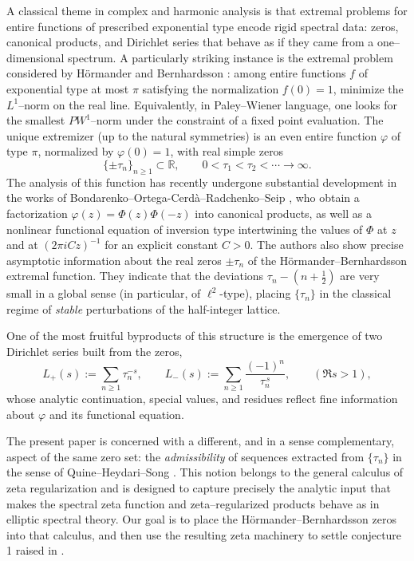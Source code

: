 \documentclass[11pt,letterpaper]{amsart}
\numberwithin{equation}{section}
\theoremstyle{definition}
\newcommand{\R}{\mathbb{R}}
\begin{document}
A classical theme in complex and harmonic analysis is that extremal problems for
entire functions of prescribed exponential type encode rigid spectral data: zeros,
canonical products, and Dirichlet series that behave as if they came from a
one--dimensional spectrum.  A particularly striking instance is the extremal
problem considered by H\"ormander and Bernhardsson \cite{HB93}: among entire functions
$f$ of exponential type at most $\pi$ satisfying the normalization $f(0)=1$, minimize
the $L^1$--norm on the real line.  Equivalently, in Paley--Wiener language, one looks
for the smallest $PW^1$--norm under the constraint of a fixed point evaluation.
The unique extremizer (up to the natural symmetries) is an even entire function
$\varphi$ of type $\pi$, normalized by $\varphi(0)=1$, with real simple zeros
\[
\{\pm\tau_n\}_{n\ge1}\subset\R,\qquad 0<\tau_1<\tau_2<\cdots\to\infty.
\]
The analysis of this function has recently undergone substantial development in the
works of Bondarenko--Ortega-Cerd\`a--Radchenko--Seip \cite{BOCRS,BOCRS2024_HBI}, who obtain a
factorization $\varphi(z)=\Phi(z)\Phi(-z)$ into canonical products, as well as a
nonlinear functional equation of inversion type intertwining the values of $\Phi$
at $z$ and at $(2\pi i C z)^{-1}$ for an explicit constant $C>0$. The authors also show precise asymptotic information about
the real zeros $\pm\tau_n$ of the H\"ormander--Bernhardsson extremal function.
They indicate that the deviations $\tau_n-(n+\tfrac12)$ are very small in a global sense (in particular, of $\ell^{2}$-type), placing $\{\tau_n\}$ in the classical regime of \emph{stable} perturbations of the half-integer lattice. 

One of the most fruitful byproducts of this structure is the emergence of two Dirichlet
series built from the zeros,
\[
L_+(s):=\sum_{n\ge1}\tau_n^{-s},
\qquad
L_-(s):=\sum_{n\ge1}\frac{(-1)^n}{\tau_n^{\,s}},
\qquad (\Re s>1),
\]
whose analytic continuation, special values, and residues reflect fine information
about $\varphi$ and its functional equation.

The present paper is concerned with a different, and in a sense complementary, aspect
of the same zero set: the \emph{admissibility} of sequences extracted from
$\{\tau_n\}$ in the sense of Quine--Heydari--Song \cite{QHS}.
This notion belongs to the general calculus of zeta regularization and is designed
to capture precisely the analytic input that makes the spectral zeta function and
zeta--regularized products behave as in elliptic spectral theory.
Our goal is to place the H\"ormander--Bernhardsson zeros into that calculus, and then
use the resulting zeta machinery to settle conjecture 1 raised in \cite{BOCRS}.
\end{document}
